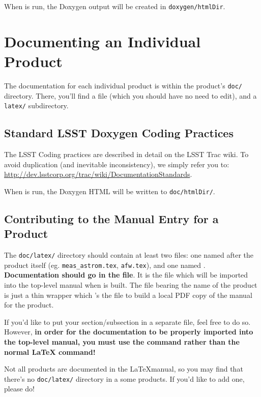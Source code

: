When \ttscons is run, the Doxygen output will be created in
\texttt{doxygen/htmlDir}.


\section{Documenting an Individual Product\label{sec-productdoc}}

The documentation for each individual product is within the product's
\texttt{doc/} directory.  There, you'll find a \ttdoxygenconf file
(which you should have no need to edit), and a \texttt{latex/}
subdirectory.


\subsection{Standard LSST Doxygen Coding Practices\label{sec-doxypractices}}

The LSST Coding practices are described in detail on the LSST Trac
wiki.  To avoid duplication (and inevitable inconsistency), we simply
refer you to:
\url{http://dev.lsstcorp.org/trac/wiki/DocumentationStandards}.

When \ttscons is run, the Doxygen HTML will be written to \texttt{doc/htmlDir/}.


\subsection{Contributing to the Manual Entry for a Product\label{sec-productlatex}}

The \texttt{doc/latex/} directory should contain at least two \tttex
files: one named after the product itself
(eg. \texttt{meas\_astrom.tex}, \texttt{afw.tex}), and one named
\ttpackage.  {\bfseries Documentation should go in the \ttpackage
  file}.  It is the \ttpackage file which will be imported into the
top-level manual when \ttdevenvdoc is built.  The \tttex file bearing
the name of the product is just a thin wrapper which \ttinput's the
\ttpackage file to build a local PDF copy of the manual for the
product.

If you'd like to put your section/subsection in a separate \tttex
file, feel free to do so.  However, {\bfseries in order for the
  documentation to be properly imported into the top-level manual, you
  must use the \ttlsstinput command rather than the normal \LaTeX
  \ttinput command!}

Not all products are documented in the \LaTeX manual, so you may find
that there's no \texttt{doc/latex/} directory in a some products.  If
you'd like to add one, please do!

